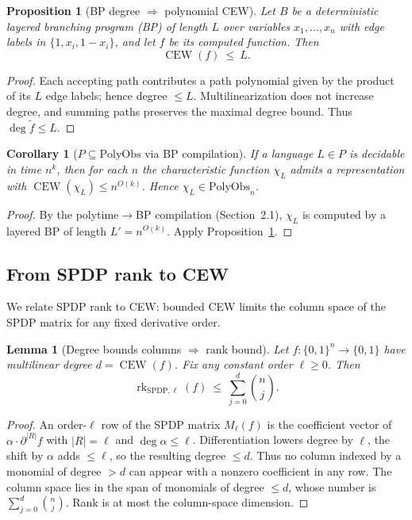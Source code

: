 \documentclass[12pt]{article}
\newtheorem{lemma}[theorem]{Lemma}
\newtheorem{proposition}[theorem]{Proposition}
\newtheorem{corollary}[theorem]{Corollary}
\theoremstyle{definition}
\theoremstyle{definition}
\theoremstyle{remark}
\theoremstyle{remark}
\begin{document}
\begin{proposition}[BP degree $\Rightarrow$ polynomial CEW]\label{prop:bp-cew}
Let $B$ be a deterministic layered branching program (BP) of length $L$ over variables $x_1,\dots,x_n$ with edge labels in $\{1,x_i,1-x_i\}$, and let $f$ be its computed function. Then
\[
\operatorname{CEW}(f) \ \le\ L.
\]
\end{proposition}

\begin{proof}
Each accepting path contributes a path polynomial given by the product of its $L$ edge labels; hence degree $\le L$. Multilinearization does not increase degree, and summing paths preserves the maximal degree bound. Thus $\deg\tilde f\le L$.
\end{proof}

\begin{corollary}[$P \subseteq \mathrm{PolyObs}$ via BP compilation]\label{cor:p-polyobs}
If a language $L\in P$ is decidable in time $n^k$, then for each $n$ the characteristic function $\chi_L$ admits a representation with $\operatorname{CEW}(\chi_L)\le n^{O(k)}$. Hence $\chi_L\in\mathrm{PolyObs}_n$.
\end{corollary}

\begin{proof}
By the polytime$\to$BP compilation (Section~2.1), $\chi_L$ is computed by a layered BP of length $L'=n^{O(k)}$. Apply Proposition~\ref{prop:bp-cew}.
\end{proof}

\subsection{From SPDP rank to CEW}

We relate SPDP rank to CEW: bounded CEW limits the column space of the SPDP matrix for any fixed derivative order.

\begin{lemma}[Degree bounds columns $\Rightarrow$ rank bound]\label{lem:deg-rank}
Let $f:\{0,1\}^n\to\{0,1\}$ have multilinear degree $d=\operatorname{CEW}(f)$. Fix any constant order $\ell\ge 0$. Then
\[
\operatorname{rk}_{\mathrm{SPDP},\ell}(f) \ \le\ \sum_{j=0}^d \binom{n}{j}.
\]
\end{lemma}

\begin{proof}
An order-$\ell$ row of the SPDP matrix $M_\ell(f)$ is the coefficient vector of $\alpha\cdot\partial^{|R|}f$ with $|R|=\ell$ and $\deg\alpha\le\ell$. Differentiation lowers degree by $\ell$, the shift by $\alpha$ adds $\le\ell$, so the resulting degree $\le d$. Thus no column indexed by a monomial of degree $>d$ can appear with a nonzero coefficient in any row. The column space lies in the span of monomials of degree $\le d$, whose number is $\sum_{j=0}^d\binom{n}{j}$. Rank is at most the column-space dimension.
\end{proof}
\end{document}
